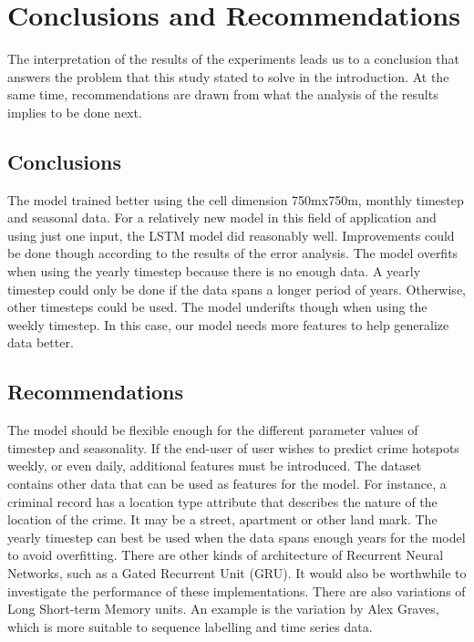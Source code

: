 \chapter{Conclusions and Recommendations}
    The interpretation of the results of the experiments leads us to a conclusion that answers the problem that this study stated to solve in the introduction. At the same time, recommendations are drawn from what the analysis of the results implies to be done next.

\section{Conclusions}
    The model trained better using the cell dimension 750mx750m, monthly timestep and seasonal data. For a relatively new model in this field of application and using just one input, the LSTM model did reasonably well. Improvements could be done though according to the results of the error analysis. The model overfits when using the yearly timestep because there is no enough data. A yearly timestep could only be done if the data spans a longer period of years. Otherwise, other timesteps could be used. The model underifts though when using the weekly timestep. In this case, our model needs more features to help generalize data better.
\section{Recommendations}
    The model should be flexible enough for the different parameter values of timestep and seasonality. If the end-user of user wishes to predict crime hotspots weekly, or even daily, additional features must be introduced. The dataset contains other data that can be used as features for the model. For instance, a criminal record has a location type attribute that describes the nature of the location of the crime. It may be a street, apartment or other land mark. The yearly timestep can best be used when the data spans enough years for the model to avoid overfitting.
    There are other kinds of architecture of Recurrent Neural Networks, such as a Gated Recurrent Unit (GRU). It would also be worthwhile to investigate the performance of these implementations.
    There are also variations of Long Short-term Memory units. An example is the variation by Alex Graves, which is more suitable to sequence labelling and time series data.
